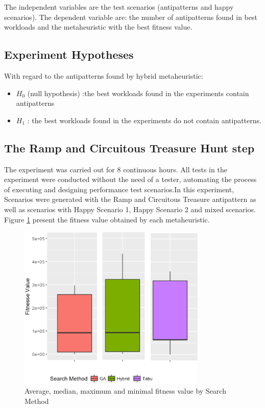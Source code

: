\documentclass[espaco=umemeio,chapter=TITLE,twoside,openright]{abnt}
\begin{document}
The independent variables are the test scenarios (antipatterns and happy scenarios). The dependent variable are: the number of antipatterns found in best workloads and the metaheuristic with the best fitness value.

\subsection{Experiment Hypotheses}

With regard to the antipatterns found by hybrid metaheuristic:
\begin{itemize}
\item $H_{0}$ (null hypothesis) :the best workloads found in the experiments contain antipatterns
\item $H_{1}$  : the best workloads found in the experiments do not contain antipatterns.
\end{itemize}

\subsection{The Ramp and Circuitous Treasure Hunt step}

The experiment was carried out for 8 continuous hours.  All tests in the experiment were conducted without the need of a tester, automating the process of executing and designing performance test scenarios.In this experiment, Scenarios were generated with the Ramp and Circuitous Treasure antipattern as well as scenarios with Happy Scenario 1, Happy Scenario 2 and mixed scenarios. Figure \ref{fig:boxplot1} present the fitness value obtained by each metaheuristic.

\begin{figure}[h]
\centering
\includegraphics[width=0.8\textwidth]{./images/antipattern1.png}
\caption{Average, median, maximum and minimal fitness value by Search Method}
\label{fig:boxplot1}
\end{figure}
\end{document}
